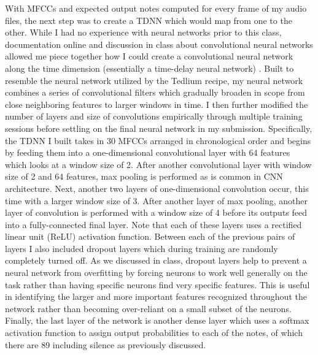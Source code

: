 \documentclass[conference]{IEEEtran}
\begin{document}
With MFCCs and expected output notes computed for every frame of my audio files, the next step was to create a TDNN which would map from one to the other. While I had no experience with neural networks prior to this class, documentation online and discussion in class about convolutional neural networks allowed me piece together how I could create a convolutional neural network along the time dimension (essentially a time-delay neural network) \cite{chil}. Built to resemble the neural network utilized by the Tedlium recipe, my neural network combines a series of convolutional filters which gradually broaden in scope from close neighboring features to larger windows in time. I then further modified the number of layers and size of convolutions empirically through multiple training sessions before settling on the final neural network in my submission. Specifically, the TDNN I built takes in 30 MFCCs arranged in chronological order and begins by feeding them into a one-dimensional convolutional layer with 64 features which looks at a window size of 2. After another convolutional layer with window size of 2 and 64 features, max pooling is performed as is common in CNN architecture. Next, another two layers of one-dimensional convolution occur, this time with a larger window size of 3. After another layer of max pooling, another layer of convolution is performed with a window size of 4 before its outputs feed into a fully-connected final layer. Note that each of these layers uses a rectified linear unit (ReLU) activation function. Between each of the previous pairs of layers I also included dropout layers which during training are randomly completely turned off. As we discussed in class, dropout layers help to prevent a neural network from overfitting by forcing neurons to work well generally on the task rather than having specific neurons find very specific features. This is useful in identifying the larger and more important features recognized throughout the network rather than becoming over-reliant on a small subset of the neurons. Finally, the last layer of the network is another dense layer which uses a softmax activation function to assign output probabilities to each of the notes, of which there are 89 including silence as previously discussed.
\end{document}
